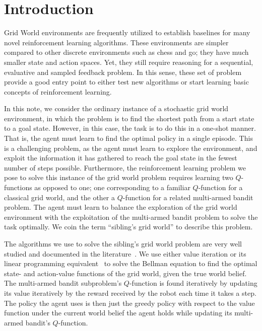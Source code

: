 \section{Introduction}
\label{sec:intro}
%
Grid World environments are frequently utilized to establish baselines for many
novel reinforcement learning algorithms. These environments are simpler compared
to other discrete environments such as chess and go; they have much smaller
state and action spaces. Yet, they still require reasoning for a sequential,
evaluative and sampled feedback problem. In this sense, these set of problem
provide a good entry point to either test new algorithms or start learning basic
concepts of reinforcement learning.

In this note, we consider the ordinary instance of a stochastic grid world
environment, in which the problem is to find the shortest path from a start
state to a goal state. However, in this case, the task is to do this in a
one-shot manner. That is, the agent must learn to find the optimal policy in a
single episode. This is a challenging problem, as the agent must learn to
explore the environment, and exploit the information it has gathered to reach
the goal state in the fewest number of steps possible. Furthermore, the
reinforcement learning problem we pose to solve this instance of the grid world
problem requires learning two $Q$-functions as opposed to one; one corresponding
to a familiar $Q$-function for a classical grid world, and the other a
$Q$-function for a related multi-armed bandit problem. The agent must learn to
balance the exploration of the grid world environment with the exploitation of
the multi-armed bandit problem to solve the task optimally. We coin the term 
``sibling's grid world'' to describe this problem.

The algorithms we use to solve the sibling's grid world problem are very well
studied and documented in the literature~\cite{sutton2018reinforcement}. We use
either value iteration or its linear programming
equivalent~\cite{luenberger2008linear} to solve the Bellman equation to find the
optimal state- and action-value functions of the grid world, given the true
world belief. The multi-armed bandit subproblem's $Q$-function is found 
iteratively by updating its value iteratively by the reward received by the 
robot each time it takes a step. The policy the agent uses is then just the greedy policy with respect to the value function under the current world belief 
the agent holds while updating its multi-armed bandit's $Q$-function.

